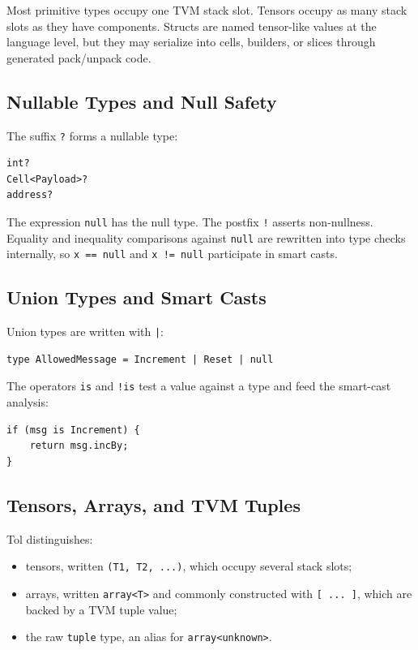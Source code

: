 \documentclass[12pt,oneside]{article}
\begin{document}
Most primitive types occupy one TVM stack slot. Tensors occupy as many stack
slots as they have components. Structs are named tensor-like values at the
language level, but they may serialize into cells, builders, or slices through
generated pack/unpack code.

\subsection{Nullable Types and Null Safety}
The suffix \verb|?| forms a nullable type:

\begin{verbatim}
int?
Cell<Payload>?
address?
\end{verbatim}

The expression \verb|null| has the null type. The postfix \verb|!| asserts
non-nullness. Equality and inequality comparisons against \verb|null| are
rewritten into type checks internally, so \verb|x == null| and
\verb|x != null| participate in smart casts.

\subsection{Union Types and Smart Casts}
Union types are written with \verb+|+:

\begin{verbatim}
type AllowedMessage = Increment | Reset | null
\end{verbatim}

The operators \verb|is| and \verb|!is| test a value against a type and feed the
smart-cast analysis:

\begin{verbatim}
if (msg is Increment) {
    return msg.incBy;
}
\end{verbatim}

\subsection{Tensors, Arrays, and TVM Tuples}
Tol distinguishes:

\begin{itemize}
\item tensors, written \verb|(T1, T2, ...)|, which occupy several stack slots;
\item arrays, written \verb|array<T>| and commonly constructed with
\verb|[ ... ]|, which are backed by a TVM tuple value;
\item the raw \verb|tuple| type, an alias for \verb|array<unknown>|.
\end{itemize}
\end{document}
